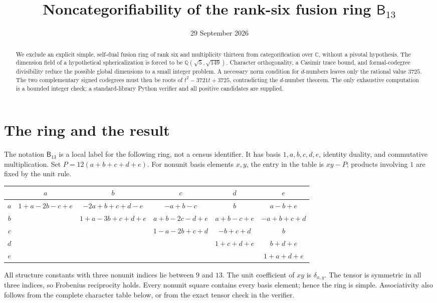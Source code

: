 \documentclass[11pt]{article}
\title{Noncategorifiability of the rank-six fusion ring $\mathsf B_{13}$}
\author{}
\date{29 September 2026}
\newcommand{\Q}{\mathbb Q}
\newcommand{\C}{\mathbb C}
\newcommand{\B}{\mathsf B_{13}}
\numberwithin{equation}{section}
\begin{document}
\maketitle
\begin{abstract}
We exclude an explicit simple, self-dual fusion ring of rank six and multiplicity
thirteen from categorification over $\C$, without a pivotal hypothesis.
The dimension field of a hypothetical sphericalization is forced to be
$\Q(\sqrt5,\sqrt{149})$. Character orthogonality, a Casimir trace bound, and
formal-codegree divisibility reduce the possible global dimensions to a small
integer problem. A necessary norm condition for $d$-numbers leaves only the
rational value $3725$. The two complementary signed codegrees must then be roots
of $t^2-3721t+3725$, contradicting the $d$-number theorem. The only exhaustive
computation is a bounded integer check; a standard-library Python verifier and
all positive candidates are supplied.
\end{abstract}

\section{The ring and the result}
The notation $\B$ is a local label for the following ring, not a census identifier.
It has basis $1,a,b,c,d,e$, identity duality, and commutative multiplication.
Set $P=12(a+b+c+d+e)$. For nonunit basis elements $x,y$, the entry in the table
is $xy-P$; products involving $1$ are fixed by the unit rule.
\begin{center}
\small
\renewcommand{\arraystretch}{1.65}
\setlength{\tabcolsep}{4pt}
\begin{tabular}{c|ccccc}
 & $a$ & $b$ & $c$ & $d$ & $e$\\ \hline
$a$ & $1+a-2b-c+e$ & $-2a+b+c+d-e$ & $-a+b-c$ & $b$ & $a-b+e$\\
$b$ & & $1+a-3b+c+d+e$ & $a+b-2c-d+e$ & $a+b-c+e$ & $-a+b+c+d$\\
$c$ & & & $1-a-2b+c+d$ & $-b+c+d$ & $b$\\
$d$ & & & & $1+c+d+e$ & $b+d+e$\\
$e$ & & & & & $1+a+d+e$
\end{tabular}
\end{center}
All structure constants with three nonunit indices lie between $9$ and $13$. The unit coefficient
of $xy$ is $\delta_{x,y}$. The tensor is symmetric in all three indices, so
Frobenius reciprocity holds. Every nonunit square contains every basis element;
hence the ring is simple. Associativity also follows from the complete character
table below, or from the exact tensor check in the verifier.
\end{document}
